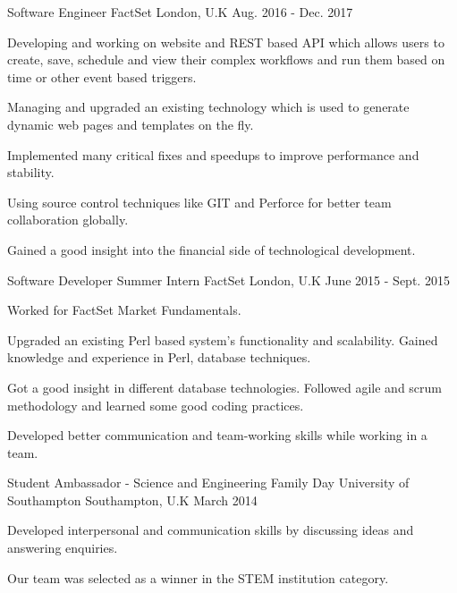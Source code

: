 \begin{cventries}
  \cventry
    {Software Engineer} %
    {FactSet} %
    {London, U.K} %
    {Aug. 2016 - Dec. 2017} %
    {
      \begin{cvitems} %
        \item {Developing and working on website and REST based API which allows users to create, save, schedule and view their complex workflows and run them based on time or other event based triggers.}
        \item {Managing and upgraded an existing technology which is used to generate dynamic web pages and templates on the fly.}
        \item {Implemented many critical fixes and speedups to improve performance and stability.}
		\item {Using source control techniques like GIT and Perforce for better team collaboration globally.}
        \item {Gained a good insight into the financial side of technological development.}
      \end{cvitems}
    }

  \cventry
    {Software Developer Summer Intern} %
    {FactSet} %
    {London, U.K} %
    {June 2015 - Sept. 2015} %
    {
      \begin{cvitems} %
        \item {Worked for FactSet Market Fundamentals.}
        \item {Upgraded an existing Perl based system’s functionality and scalability. Gained knowledge and experience in Perl, database techniques.}
        \item {Got a good insight in different database technologies. Followed agile and scrum methodology and learned some good coding practices.}
        \item {Developed better communication and team-working skills while working in a team.}
      \end{cvitems}
    }

  \cventry
    {Student Ambassador - Science and Engineering Family Day} %
    {University of Southampton} %
    {Southampton, U.K} %
    {March 2014} %
    {
      \begin{cvitems} %
        \item {Developed interpersonal and communication skills by discussing ideas and answering enquiries.}
        \item {Our team was selected as a winner in the STEM institution category.}
      \end{cvitems}
    }

\end{cventries}
